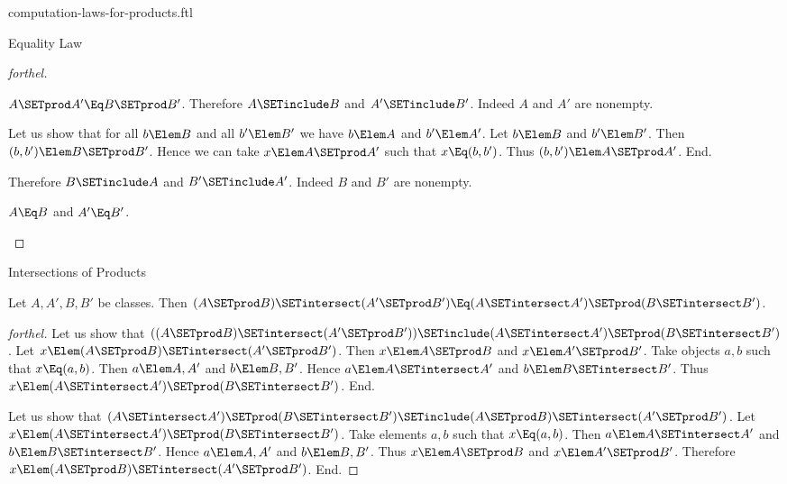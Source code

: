 \documentclass{stex}
\begin{document}
\begin{smodule}{computation-laws-for-products.ftl}
\begin{sfragment}{Equality Law}
\begin{proof}[forthel]
\begin{case}{$A \SETprod A' \Eq B \SETprod B'$.}
      Therefore $A \SETinclude B$ and $A' \SETinclude B'$.
      Indeed $A$ and $A'$ are nonempty.

      Let us show that for all $b \Elem B$ and all $b' \Elem B'$ we have $b \Elem A$ and $b' \Elem A'$.
        Let $b \Elem B$ and $b' \Elem B'$.
        Then $(b, b') \Elem B \SETprod B'$.
        Hence we can take $x \Elem A \SETprod A'$ such that $x \Eq (b, b')$.
        Thus $(b, b') \Elem A \SETprod A'$.
      End.

      Therefore $B \SETinclude A$ and $B' \SETinclude A'$.
      Indeed $B$ and $B'$ are nonempty.
    \end{case}

    \begin{case}{$A \Eq B$ and $A' \Eq B'$.} \end{case}
  \end{proof}
\end{sfragment}

\begin{sfragment}{Intersections of Products}
  \begin{proposition}[forthel,id=FOUNDATIONS_05_4154592050806784]
    Let $A, A', B, B'$ be classes.
    Then $(A \SETprod B) \SETintersect (A' \SETprod B') \Eq (A \SETintersect A') \SETprod (B \SETintersect B')$.
  \end{proposition}
  \begin{proof}[forthel]
    Let us show that $((A \SETprod B) \SETintersect (A' \SETprod B')) \SETinclude (A \SETintersect A') \SETprod (B \SETintersect B')$. %
      Let $x \Elem (A \SETprod B) \SETintersect (A' \SETprod B')$.
      Then $x \Elem A \SETprod B$ and $x \Elem A' \SETprod B'$.
      Take objects $a, b$ such that $x \Eq (a, b)$.
      Then $a \Elem A, A'$ and $b \Elem B, B'$.
      Hence $a \Elem A \SETintersect A'$ and $b \Elem B \SETintersect B'$.
      Thus $x \Elem (A \SETintersect A') \SETprod (B \SETintersect B')$.
    End.

    Let us show that $(A \SETintersect A') \SETprod (B \SETintersect B') \SETinclude (A \SETprod B) \SETintersect (A' \SETprod B')$.
      Let $x \Elem (A \SETintersect A') \SETprod (B \SETintersect B')$.
      Take elements $a, b$ such that $x \Eq (a, b)$.
      Then $a \Elem A \SETintersect A'$ and $b \Elem B \SETintersect B'$.
      Hence $a \Elem A, A'$ and $b \Elem B, B'$.
      Thus $x \Elem A \SETprod B$ and $x \Elem A' \SETprod B'$.
      Therefore $x \Elem (A \SETprod B) \SETintersect (A' \SETprod B')$.
    End.
  \end{proof}
\end{sfragment}


\end{smodule}
\end{document}
